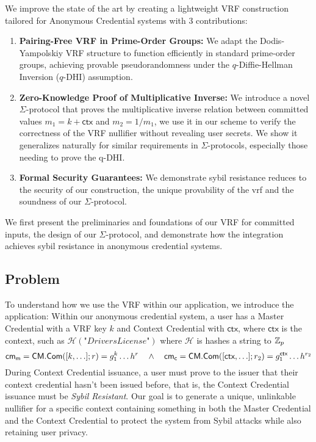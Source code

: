 \noindent We improve the state of the art by creating a lightweight VRF construction tailored for Anonymous Credential systems with 3 contributions:
\begin{enumerate}
        \item \textbf{Pairing-Free VRF in Prime-Order Groups:} We adapt the Dodis-Yampolskiy VRF structure to function efficiently in standard prime-order groups, achieving provable pseudorandomness under the $q$-Diffie-Hellman Inversion ($q$-DHI) assumption.

        \item \textbf{Zero-Knowledge Proof of Multiplicative Inverse:} We introduce a novel $\Sigma$-protocol that proves the multiplicative inverse relation between committed values $m_1 = k + \textsf{ctx}$ and $m_2 = 1/m_1$, we use it in our scheme to verify the correctness of the VRF nullifier without revealing user secrets. We show it generalizes naturally for similar requirements in $\Sigma$-protocols, especially those needing to prove the q-DHI.

         \item \textbf{Formal Security Guarantees:} We demonstrate sybil resistance reduces to the security of our construction, the unique provability of the vrf and the soundness of our $\Sigma$-protocol.
\end{enumerate}
We first present the preliminaries and foundations of our VRF for committed inputs, the design of our $\Sigma$-protocol, and demonstrate how the integration achieves sybil resistance in anonymous credential systems.


\subsection{Problem}
To understand how we use the VRF within our application, we introduce the application:
Within our anonymous credential system, a user has a Master Credential with a VRF key $k$ and Context Credential with $\textsf{ctx}$, where $\textsf{ctx}$ is the context, such as $\mathcal{H}(\textit{"DriversLicense"})$ where $\mathcal{H}$ is hashes a string to $\mathbb{Z}_p$
\[
\mathsf{cm}_{\textsf{m}} = \mathsf{CM.Com}([k, \ldots]; r) = g_1^{k}\ldots h^r \quad \wedge \quad \mathsf{cm}_{\textsf{c}} = \mathsf{CM.Com}([\textsf{ctx}, \ldots]; r_2) = g_1^{\textsf{ctx}} \ldots h^{r_2}
\]
During Context Credential issuance, a user must prove to the issuer that their context credential hasn't been issued before, that is, the Context Credential issuance must be \emph{Sybil Resistant}. Our goal is to generate a unique, unlinkable nullifier for a specific context containing something in both the Master Credential and the Context Credential to protect the system from Sybil attacks while also retaining user privacy.

